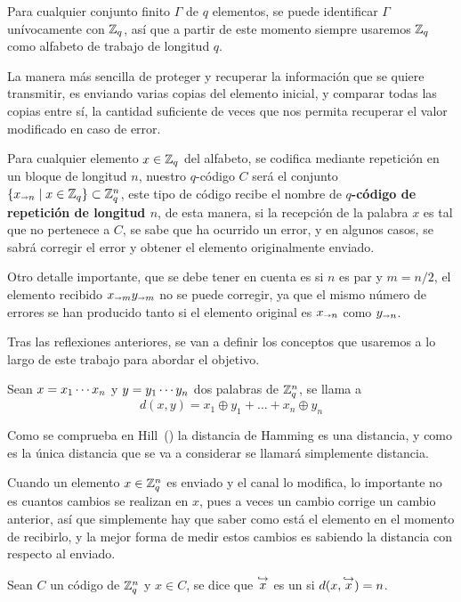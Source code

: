 Para cualquier conjunto finito $\Gamma$ de $q$ elementos, se puede identificar $\Gamma$ unívocamente con $\mathbb{Z}_q$, así que a partir de este momento siempre usaremos $\mathbb{Z}_q$ como alfabeto de trabajo de longitud $q$.

La manera más sencilla de proteger y recuperar la información que se quiere transmitir, es enviando varias copias del elemento inicial, y comparar todas las copias entre sí, la cantidad suficiente de veces que nos permita recuperar el valor modificado en caso de error.

Para cualquier elemento $x\in\mathbb{Z}_q$ del alfabeto, se codifica mediante repetición en un bloque de longitud $n$, nuestro $q$-código $C$ será el conjunto $\left\{x_{\shortrightarrow n}\mid x\in\mathbb{Z}_q\right\}\subset \mathbb{Z}_q^n$, este tipo de código recibe el nombre de \textbf{$q$-código de repetición de longitud $n$}, de esta manera, si la recepción de la palabra $x$ es tal que no pertenece a $C$, se sabe que ha ocurrido un error, y en algunos casos, se sabrá corregir el error y obtener el elemento originalmente enviado.

Otro detalle importante, que se debe tener en cuenta es si $n$ es par y $m=n/2$, el elemento recibido $x_{\shortrightarrow m}y_{\shortrightarrow m}$ no se puede corregir, ya que el mismo número de errores se han producido tanto si el elemento original es $x_{\shortrightarrow n}$ como $y_{\shortrightarrow n}$.

Tras las reflexiones anteriores, se van a definir los conceptos que usaremos a lo largo de este trabajo para abordar el objetivo.

\begin{definition}
	Sean $x=x_1\cdots x_{n}$ y $y=y_1\cdots y_{n}$ dos palabras de $\mathbb{Z}_q^n$, se llama  a
	\[
		d(x, y) = x_1\oplus y_1 + \dots + x_n\oplus y_n
	\]
\end{definition}

Como se comprueba en Hill~(\cite{hill_first_1980}) la distancia de Hamming es una distancia, y como es la única distancia que se va a considerar se llamará simplemente distancia.

Cuando un elemento $x\in\mathbb{Z}_q^n$ es enviado y el canal lo modifica, lo importante no es cuantos cambios se realizan en $x$, pues a veces un cambio corrige un cambio anterior, así que simplemente hay que saber como está el elemento en el momento de recibirlo, y la mejor forma de medir estos cambios es sabiendo la distancia con respecto al enviado.

\begin{definition}
	Sean $C$ un código de $\mathbb{Z}_q^n$ y $x\in C$, se dice que $\stackrel{\hookrightarrow}{x}$ es un  si $d(x, \stackrel{\hookrightarrow}{x})= n$.
\end{definition}

